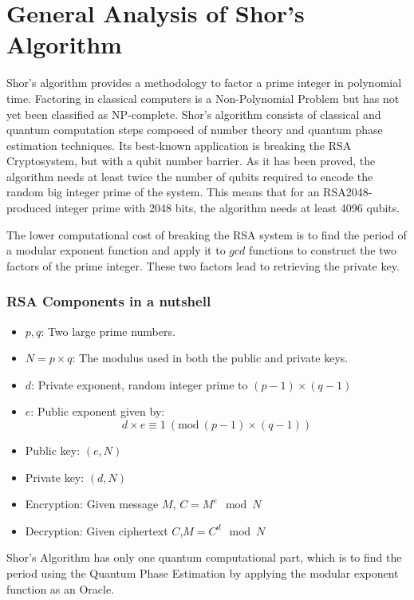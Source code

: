\section{General Analysis of Shor's Algorithm}

\begin{flushleft}

Shor's algorithm provides a methodology to factor a prime integer in polynomial time.
Factoring in classical computers is a Non-Polynomial Problem but has not yet been classified as NP-complete. Shor's algorithm consists of classical and quantum computation steps composed of number theory and quantum phase estimation techniques. Its best-known application is breaking the RSA Cryptosystem, but with a qubit number barrier. As it has been proved, the algorithm needs at least twice the number of qubits required to encode the random big integer prime of the system. This means that for an RSA2048-produced integer prime with 2048 bits, the algorithm needs at least 4096 qubits.

The lower computational cost of breaking the RSA system is to find the period of a modular exponent function and apply it to $gcd$ functions to construct the two factors of the prime integer. These two factors lead to retrieving the private key.

\subsubsection{RSA Components in a nutshell}
\begin{itemize}
    \item \( p, q \): Two large prime numbers.
    \item \( N = p \times q \): The modulus used in both the public and private keys.
    \item \( d \): Private exponent, random integer prime to $(p - 1) \times (q - 1)$
    \item \( e \): Public exponent given by:
    \[
    d \times e \equiv 1 \ (\text{mod} \ (p - 1) \times (q - 1))
    \]
    \item Public key: \( (e, N) \)
    \item Private key: \( (d, N) \)
    \item Encryption: Given message \( M \), $C = M^e \mod N$
    \item Decryption: Given ciphertext \( C \),$M = C^d \mod N$
\end{itemize}

Shor's Algorithm has only one quantum computational part, which is to find the period using the Quantum Phase Estimation by applying the modular exponent function as an Oracle.


\end{flushleft}
